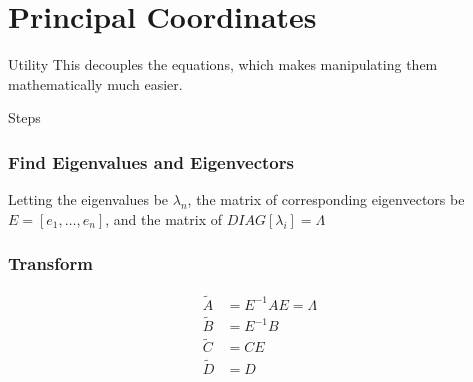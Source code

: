 \documentclass{../templates/topic}
\begin{document}
\chapter{Principal Coordinates}

\begin{section}{Utility}
	This decouples the equations, which makes manipulating them mathematically much easier.
\end{section}

\begin{section}{Steps}
	\subsection{Find Eigenvalues and Eigenvectors}
		Letting the eigenvalues be $\lambda_n$, the matrix of corresponding eigenvectors be $E=[e_1, \dots, e_n]$, and the matrix of $DIAG[\lambda_i]=\Lambda$
		
	\subsection{Transform}
	\begin{align}
		\tilde{A} &= E^{-1}AE = \Lambda \\
		\tilde{B} &= E^{-1}B \\
		\tilde{C} &= CE \\
		\tilde{D} &= D
	\end{align}
\end{section}
	
\end{document}

